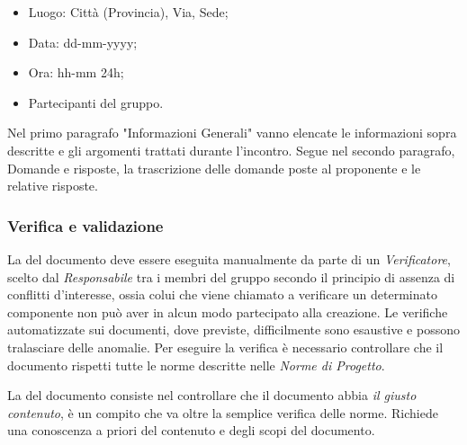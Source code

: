 	\begin{itemize}
		\item Luogo: Città (Provincia), Via, Sede;
		\item Data: dd-mm-yyyy;
		\item Ora: hh-mm 24h;
		\item Partecipanti del gruppo.
	\end{itemize}
	
	Nel primo paragrafo "Informazioni Generali" vanno elencate le informazioni sopra descritte e gli argomenti trattati durante l'incontro. Segue nel secondo paragrafo, Domande e risposte, la trascrizione delle domande poste al proponente e le relative risposte.
	
\subsubsection{Verifica e validazione}

La \textbf{} del documento deve essere eseguita manualmente da parte di un \textit{Verificatore}, scelto dal \textit{Responsabile} tra i membri del gruppo secondo il principio di assenza di conflitti d'interesse, ossia colui che viene chiamato a verificare un determinato componente non può aver in alcun modo partecipato alla creazione. Le verifiche automatizzate sui documenti, dove previste, difficilmente sono esaustive e possono tralasciare delle anomalie. Per eseguire la verifica è necessario controllare che il documento rispetti tutte le norme descritte nelle \textit{Norme di Progetto}.

La \textbf{} del documento consiste nel controllare che il documento abbia \textit{il giusto contenuto}, è un compito che va oltre la semplice verifica delle norme. Richiede una conoscenza a priori del contenuto e degli scopi del documento.
	
